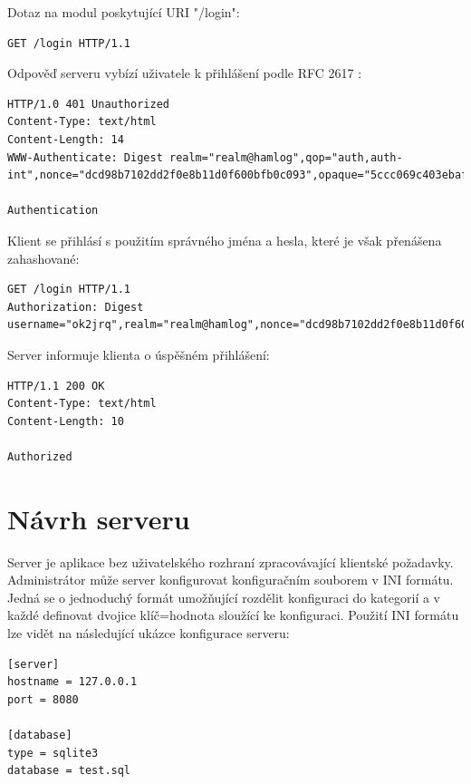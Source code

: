 Dotaz na modul poskytující URI "/login":
\begin{verbatim}
GET /login HTTP/1.1

\end{verbatim}

Odpověď serveru vybízí uživatele k přihlášení podle RFC 2617 \cite{rfc2617}:
\begin{verbatim}
HTTP/1.0 401 Unauthorized
Content-Type: text/html
Content-Length: 14
WWW-Authenticate: Digest realm="realm@hamlog",qop="auth,auth-int",nonce="dcd98b7102dd2f0e8b11d0f600bfb0c093",opaque="5ccc069c403ebaf9f0171e9517f40e41"

Authentication
\end{verbatim}

Klient se přihlásí s použitím správného jména a hesla, které je však přenášena
zahashované:
\begin{verbatim}
GET /login HTTP/1.1
Authorization: Digest username="ok2jrq",realm="realm@hamlog",nonce="dcd98b7102dd2f0e8b11d0f600bfb0c093",uri="/login",qop=auth,response="d197141dc972c02d71e6a73b3396ed53",opaque="5ccc069c403ebaf9f0171e9517f40e41")

\end{verbatim}

Server informuje klienta o úspěšném přihlášení:
\begin{verbatim}
HTTP/1.1 200 OK
Content-Type: text/html
Content-Length: 10

Authorized
\end{verbatim}

\section{Návrh serveru}
\label{navrh_server}

Server je aplikace bez uživatelského rozhraní %
zpracovávající klientské požadavky. Administrátor může server konfigurovat konfiguračním souborem
v INI formátu. %
Jedná se o jednoduchý formát umožňující rozdělit konfiguraci do kategorií
a v každé definovat dvojice klíč=hodnota sloužící ke konfiguraci. Použití INI formátu lze vidět na následující
ukázce konfigurace serveru:

\begin{verbatim}
[server]
hostname = 127.0.0.1
port = 8080

[database]
type = sqlite3
database = test.sql
\end{verbatim}
 
